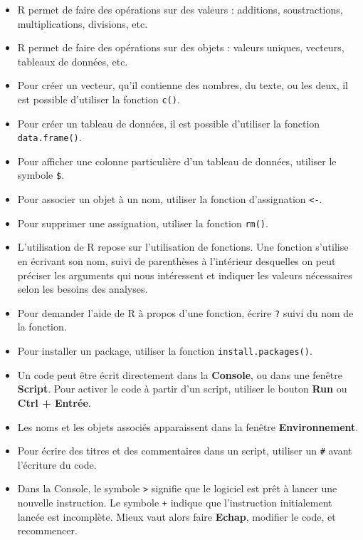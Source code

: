 \documentclass[
  french,
]{book}
\providecommand{\tightlist}{%
  \setlength{\itemsep}{0pt}\setlength{\parskip}{0pt}}
\begin{document}
\begin{itemize}
\tightlist
\item
  R permet de faire des opérations sur des valeurs : additions, soustractions, multiplications, divisions, etc.
\item
  R permet de faire des opérations sur des objets : valeurs uniques, vecteurs, tableaux de données, etc.
\item
  Pour créer un vecteur, qu'il contienne des nombres, du texte, ou les deux, il est possible d'utiliser la fonction \texttt{c()}.
\item
  Pour créer un tableau de données, il est possible d'utiliser la fonction \texttt{data.frame()}.
\item
  Pour afficher une colonne particulière d'un tableau de données, utiliser le symbole \texttt{\$}.
\item
  Pour associer un objet à un nom, utiliser la fonction d'assignation \texttt{\textless{}-}.
\item
  Pour supprimer une assignation, utiliser la fonction \texttt{rm()}.
\item
  L'utilisation de R repose sur l'utilisation de fonctions. Une fonction s'utilise en écrivant son nom, suivi de parenthèses à l'intérieur desquelles on peut préciser les arguments qui nous intéressent et indiquer les valeurs nécessaires selon les besoins des analyses.
\item
  Pour demander l'aide de R à propos d'une fonction, écrire \texttt{?} suivi du nom de la fonction.
\item
  Pour installer un package, utiliser la fonction \texttt{install.packages()}.
\item
  Un code peut être écrit directement dans la \textbf{Console}, ou dans une fenêtre \textbf{Script}. Pour activer le code à partir d'un script, utiliser le bouton \textbf{Run} ou \textbf{Ctrl + Entrée}.
\item
  Les noms et les objets associés apparaissent dans la fenêtre \textbf{Environnement}.
\item
  Pour écrire des titres et des commentaires dans un script, utiliser un \texttt{\#} avant l'écriture du code.
\item
  Dans la Console, le symbole \texttt{\textgreater{}} signifie que le logiciel est prêt à lancer une nouvelle instruction. Le symbole \texttt{+} indique que l'instruction initialement lancée est incomplète. Mieux vaut alors faire \textbf{Echap}, modifier le code, et recommencer.
\end{itemize}
\end{document}
